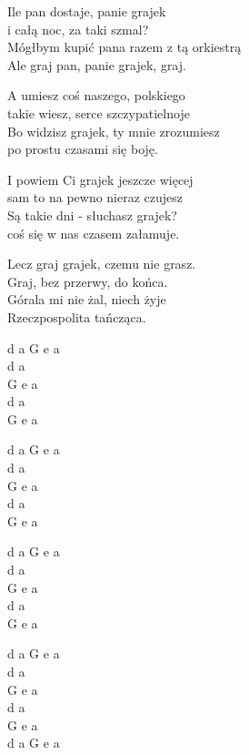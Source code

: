 \begin{text}
\hfill\break
Ile pan dostaje, panie grajek\\
i całą noc, za taki szmal?\\
Mógłbym kupić pana razem z tą orkiestrą\\
Ale graj pan, panie grajek, graj.

\hfill\break
A umiesz coś naszego, polskiego\\
takie wiesz, serce szczypatielnoje\\
Bo widzisz grajek, ty mnie zrozumiesz\\
po prostu czasami się boję.

\hfill\break
I powiem Ci grajek jeszcze więcej\\
sam to na pewno nieraz czujesz\\
Są takie dni - słuchasz grajek?\\
coś się w nas czasem załamuje.

\hfill\break
Lecz graj grajek, czemu nie grasz.\\
Graj, bez przerwy, do końca.\\
Górala mi nie żal, niech żyje\\
Rzeczpospolita tańcząca.
\end{text}
\begin{chord}
d a G e a\\
d a\\
G e a\\
d a\\
G e a

d a G e a\\
d a\\
G e a\\
d a\\
G e a

d a G e a\\
d a\\
G e a\\
d a\\
G e a

d a G e a\\
d a\\
G e a\\
d a\\
G e a\\
d a G e a
\end{chord}